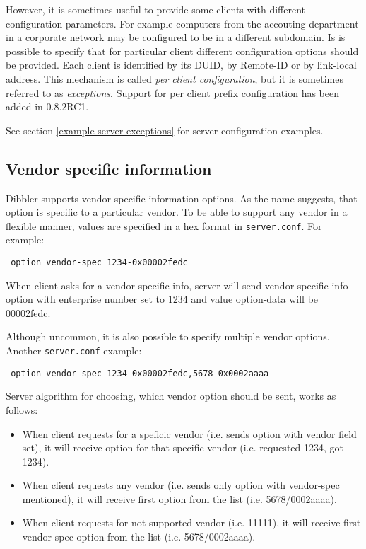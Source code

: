 However, it is sometimes useful to provide some clients with different
configuration parameters. For example computers from the accouting
department in a corporate network may be configured to be in a
different subdomain. Is is possible to specify that for particular
client different configuration options should be provided. Each client
is identified by its DUID, by Remote-ID or by link-local address. This
mechanism is called \emph{per client configuration}, but it is
sometimes referred to as \emph{exceptions}. Support for per client
prefix configuration has been added in 0.8.2RC1.

See section \ref{example-server-exceptions} for server configuration
examples.

\subsection{Vendor specific information}
\label{feature-vendor-spec}
Dibbler supports vendor specific information options. As the name
suggests, that option is specific to a particular vendor. To be able
to support any vendor in a flexible manner, values are specified in a
hex format in \verb+server.conf+. For example:

\begin{lstlisting}
 option vendor-spec 1234-0x00002fedc
\end{lstlisting}

When client asks for a vendor-specific info, server will send
vendor-specific info option with enterprise number set to 1234 and
value option-data will be 00002fedc.

Although uncommon, it is also possible to specify multiple vendor
options. Another \verb+server.conf+ example:

\begin{lstlisting}
 option vendor-spec 1234-0x00002fedc,5678-0x0002aaaa
\end{lstlisting}

Server algorithm for choosing, which vendor option should be sent,
works as follows:

\begin{itemize}
\item When client requests for a speficic vendor (i.e. sends
   option with vendor field set), it will
  receive option for that specific vendor (i.e. requested 1234, got
  1234).
 \item When client requests any vendor (i.e. sends only  option with vendor-spec mentioned), it will receive first
    option from the list (i.e. 5678/0002aaaa).
 \item When client requests for not supported vendor (i.e. 11111), it
   will receive first vendor-spec option from the list
   (i.e. 5678/0002aaaa).
\end{itemize}

